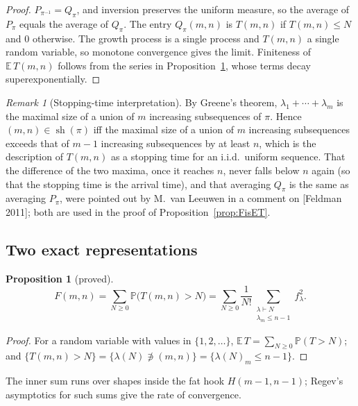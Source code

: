 \documentclass[11pt]{article}
\newtheorem{proposition}[theorem]{Proposition}
\theoremstyle{definition}
\theoremstyle{remark}
\newtheorem{remark}[theorem]{Remark}
\newcommand{\E}{\mathbb{E}}
\newcommand{\Prob}{\mathbb{P}}
\DeclareMathOperator{\sh}{sh}
\begin{document}
\begin{proof}
$P_{\pi^{-1}}=Q_\pi$, and inversion preserves the uniform measure, so the average of $P_\pi$ equals the average of $Q_\pi$. The entry $Q_\pi(m,n)$ is $T(m,n)$ if $T(m,n)\le N$ and $0$ otherwise. The growth process is a single process and $T(m,n)$ a single random variable, so monotone convergence gives the limit. Finiteness of $\E\,T(m,n)$ follows from the series in Proposition~\ref{prop:series}, whose terms decay superexponentially.
\end{proof}

\begin{remark}[Stopping-time interpretation]\label{rem:stopping}
By Greene's theorem, $\lambda_1+\cdots+\lambda_m$ is the maximal size of a union of $m$ increasing subsequences of $\pi$. Hence $(m,n)\in\sh(\pi)$ iff the maximal size of a union of $m$ increasing subsequences exceeds that of $m-1$ increasing subsequences by at least $n$, which is the description of $T(m,n)$ as a stopping time for an i.i.d.\ uniform sequence. That the difference of the two maxima, once it reaches $n$, never falls below $n$ again (so that the stopping time is the arrival time), and that averaging $Q_\pi$ is the same as averaging $P_\pi$, were pointed out by M.~van Leeuwen in a comment on [Feldman 2011]; both are used in the proof of Proposition~\ref{prop:FisET}.
\end{remark}

\subsection{Two exact representations}

\begin{proposition}[proved]\label{prop:series}
\begin{equation}\label{eq:series}
F(m,n)=\sum_{N\ge0}\Prob\bigl(T(m,n)>N\bigr)=\sum_{N\ge0}\frac1{N!}\sum_{\substack{\lambda\vdash N\\ \lambda_m\le n-1}}f_\lambda^2 .
\end{equation}
\end{proposition}

\begin{proof}
For a random variable with values in $\{1,2,\dots\}$, $\E\,T=\sum_{N\ge0}\Prob(T>N)$; and $\{T(m,n)>N\}=\{\lambda(N)\not\ni(m,n)\}=\{\lambda(N)_m\le n-1\}$.
\end{proof}

The inner sum runs over shapes inside the fat hook $H(m-1,n-1)$; Regev's asymptotics for such sums give the rate of convergence.
\end{document}
